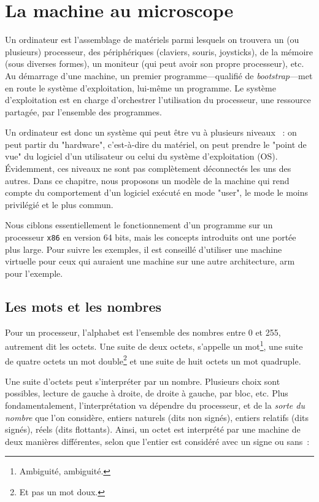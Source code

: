 \documentclass{book}
\newcommand{\xquatre}{{\tt x86}\xspace}
\begin{document}
{\chapter{La machine au microscope}

Un ordinateur est l'assemblage de matériels parmi lesquels on trouvera un (ou plusieurs) processeur, des périphériques (claviers, souris, joysticks), de la mémoire (sous diverses formes), un moniteur (qui peut avoir son propre processeur), etc. Au démarrage d'une machine, un premier programme---qualifié de \emph{bootstrap}---met en route le système d'exploitation, lui-même un programme. Le système d'exploitation est en charge d'orchestrer l'utilisation du processeur, une ressource partagée, par l'ensemble des programmes. 

Un ordinateur est donc un système qui peut être vu à plusieurs niveaux~ : on peut partir du "hardware", c'est-à-dire du matériel, on peut prendre le "point de vue" du logiciel d'un utilisateur ou celui du système d'exploitation (OS). \'Evidemment, ces niveaux ne sont pas complètement déconnectés les uns des autres. Dans ce chapitre, nous proposons un modèle de la machine qui rend compte du comportement d'un logiciel exécuté en mode "user", le mode le moins privilégié et le plus commun.

Nous ciblons essentiellement le fonctionnement d'un programme sur un processeur \xquatre en version 64 bits, mais les concepts introduits ont une portée plus large. Pour suivre les exemples, il est conseillé d'utiliser une machine virtuelle pour ceux qui auraient une machine sur une autre architecture, {\sc arm} pour l'exemple. 
  
\section{Les mots et les nombres}

Pour un processeur, l'alphabet est l'ensemble des nombres entre 0 et 255, autrement dit les octets.
Une suite de deux octets, s'appelle un mot\footnote{Ambiguité, ambiguité.}, une suite de quatre octets un mot double\footnote{Et pas un mot doux.} et une suite de huit octets un mot quadruple.

Une suite d'octets peut s'interpréter par un nombre. Plusieurs choix sont possibles, lecture de gauche à droite, de droite à gauche, par bloc, etc. Plus fondamentalement, l'interprétation va dépendre du processeur, et de la \emph{sorte du nombre} que l'on considère, entiers naturels (dits non signés), entiers relatifs (dits signés), réels (dits flottants).  Ainsi, un octet est interprété par une machine de deux manières différentes, selon que l'entier est considéré avec un signe ou sans~: 

}
\end{document}
